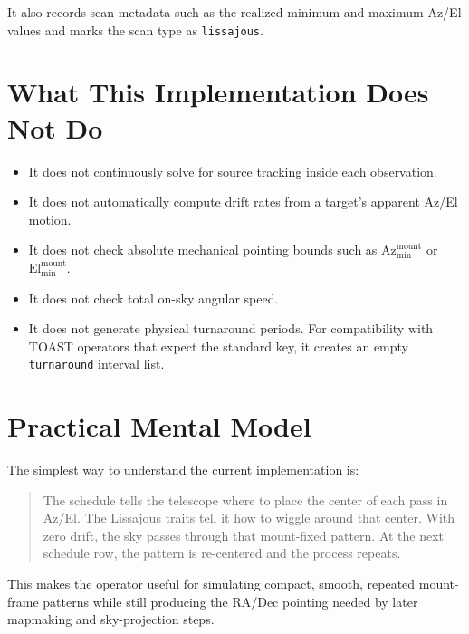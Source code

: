 \documentclass[11pt]{article}
\begin{document}
It also records scan metadata such as the realized minimum and maximum Az/El
values and marks the scan type as \texttt{lissajous}.

\section*{What This Implementation Does Not Do}

\begin{itemize}[leftmargin=*]
    \item It does not continuously solve for source tracking inside each
    observation.
    \item It does not automatically compute drift rates from a target's
    apparent Az/El motion.
    \item It does not check absolute mechanical pointing bounds such as
    \(\mathrm{Az}_{\min}^{\mathrm{mount}}\) or
    \(\mathrm{El}_{\min}^{\mathrm{mount}}\).
    \item It does not check total on-sky angular speed.
    \item It does not generate physical turnaround periods.  For compatibility
    with TOAST operators that expect the standard key, it creates an empty
    \texttt{turnaround} interval list.
\end{itemize}

\section*{Practical Mental Model}

The simplest way to understand the current implementation is:

\begin{quote}
The schedule tells the telescope where to place the center of each pass in
Az/El.  The Lissajous traits tell it how to wiggle around that center.  With
zero drift, the sky passes through that mount-fixed pattern.  At the next
schedule row, the pattern is re-centered and the process repeats.
\end{quote}

This makes the operator useful for simulating compact, smooth, repeated
mount-frame patterns while still producing the RA/Dec pointing needed by later
mapmaking and sky-projection steps.
\end{document}
